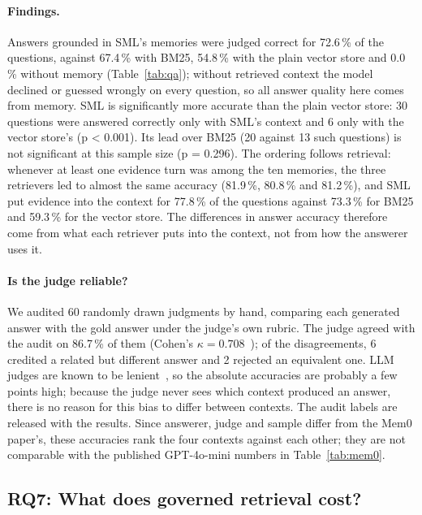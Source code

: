 \documentclass[11pt,a4paper]{article}
\theoremstyle{remark}
\newcommand{\sys}{SML}
\begin{document}
\paragraph{Findings.} Answers grounded in \sys{}'s memories were judged correct for 72.6\,\% of
the questions, against 67.4\,\% with BM25, 54.8\,\% with the plain vector store and
0.0\,\% without memory (Table~\ref{tab:qa}); without retrieved context the model declined or guessed wrongly
on every question, so all answer quality here comes from memory. \sys{} is significantly more accurate than the plain vector
store: 30 questions were answered correctly only with \sys{}'s context and 6 only with the vector
store's (p < 0.001). Its lead over BM25 (20 against 13 such questions) is not significant at this
sample size (p = 0.296). The ordering follows retrieval: whenever at least one evidence turn was among the ten memories,
the three retrievers led to almost the same accuracy (81.9\,\%, 80.8\,\% and
81.2\,\%), and \sys{} put evidence into the context for 77.8\,\% of the questions against
73.3\,\% for BM25 and 59.3\,\% for the vector store. The differences in answer accuracy therefore
come from what each retriever puts into the context, not from how the answerer uses it.

\paragraph{Is the judge reliable?} We audited 60 randomly drawn judgments by hand, comparing each generated
answer with the gold answer under the judge's own rubric. The judge agreed with the audit on 86.7\,\% of
them (Cohen's $\kappa = 0.708$~\cite{cohen1960}); of the disagreements, 6
credited a related but different answer and 2 rejected an equivalent one. LLM judges are known to be
lenient~\cite{zheng2023judging}, so the absolute accuracies are probably a few points high; because the judge never sees which
context produced an answer, there is no reason for this bias to differ between contexts. The audit labels are released with
the results. Since answerer, judge and sample differ from the Mem0 paper's, these accuracies rank the four contexts against
each other; they are not comparable with the published GPT-4o-mini numbers in Table~\ref{tab:mem0}.

\subsection{RQ7: What does governed retrieval cost?}
\label{sec:rq7}
\end{document}
